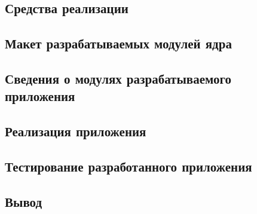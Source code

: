 
\vspace{-1\baselineskip}

\subsection{Средства реализации}

\subsection{Макет разрабатываемых модулей ядра} \label{sec:prototype}

\subsection{Сведения о модулях разрабатываемого приложения}

\subsection{Реализация приложения}

\subsection{Тестирование разработанного приложения}

\subsection*{Вывод}


